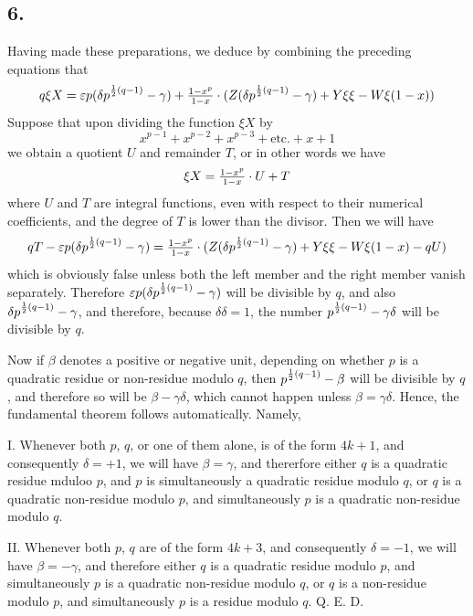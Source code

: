 \documentclass[twoside,12pt]{memoir}
\let\oldfrac\frac
\def\frac#1#2{\mathchoice{\tfrac{#1}{#2}}{\oldfrac{#1}{#2}}{\genfrac{}{}{}{2}{#1}{#2\mathstrut}}{\genfrac{}{}{}{3}{#1}{#2\mathstrut}}}
\begin{document}
\subsection*{6.}

Having made these preparations, we deduce by combining the preceding equations that
\[q \xi {X}=\varepsilon p(\delta p^{\frac{1}{2}(q-1)}-\gamma)+\frac{1-x^{p}}{1-x} \cdot(Z(\delta p^{\frac{1}{2}(q-1)}-\gamma)+Y \xi \xi-W \xi(1-x))\]
Suppose that upon dividing the function \(\xi X\) by
\[x^{p-1}+x^{p-2}+x^{p-3}+\text{etc{.}}+x+1\]
we obtain a quotient \(U\) and remainder \(T\), or in other words we have
\[\xi X=\frac{1-x^{p}}{1-x} \cdot U+T\]
where \(U\) and \(T\) are integral functions, even with respect to their numerical coefficients, and the degree of \(T\) is lower than the divisor. Then we will have
\[q T-\varepsilon p(\delta p^{\frac{1}{2}(q-1)}-\gamma)=\frac{1-x^{p}}{1-x} \cdot(Z(\delta p^{\frac{1}{2}(q-1)}-\gamma)+Y \xi \xi-W \xi(1-x)-q U)\]
which is obviously false unless both the left member and the right member vanish separately. Therefore \(\varepsilon p(\delta p^{\frac{1}{2}(q-1)}-\gamma)\) will be divisible by \(q\), and also \(\delta p^{\frac{1}{2}(q-1)}-\gamma\), and therefore, because \(\delta \delta=1\), the number \(p^{\frac{1}{2}(q-1)}-\gamma \delta\) will be divisible by \(q\).
%

Now if \(\beta\) denotes a positive or negative unit, depending on whether \(p\) is a quadratic residue or non-residue modulo \(q\), then \(p^{\frac{1}{2}(q-1)}-\beta\) will be divisible by \(q\), and therefore so will be \(\beta-\gamma \delta\), which cannot happen unless \(\beta=\gamma \delta\). Hence, the fundamental theorem follows automatically. Namely,

I. Whenever both \(p\), \(q\), or one of them alone, is of the form \(4 k+1\), and consequently \(\delta=+1\), we will have \(\beta=\gamma\), and thererfore either \(q\) is a quadratic residue mduloo \(p\), and \(p\) is simultaneously a quadratic residue modulo \(q\), or \(q\) is a quadratic non-residue modulo \(p\), and simultaneously \(p\) is a quadratic non-residue modulo \(q\).

II. Whenever both \(p\), \(q\) are of the form \(4 k+3\), and consequently \(\delta=-1\), we will have \(\beta=-\gamma\), and therefore either \(q\) is a quadratic residue modulo \(p\), and simultaneously \(p\) is a quadratic non-residue modulo \(q\), or \(q\) is a non-residue modulo \(p\), and simultaneously \(p\) is a residue modulo \(q\). Q. E. D.
%
\end{document}
